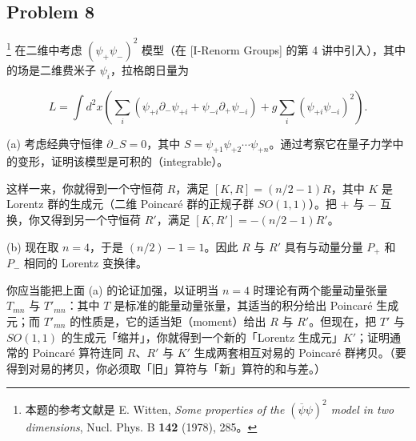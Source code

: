 
\subsection*{Problem 8}

\footnote{本题的参考文献是 E. Witten, \textit{Some properties of the $(\overline{\psi}\psi)^2$ model in two dimensions}, Nucl. Phys. B \textbf{142} (1978), 285。}%
在二维中考虑 $(\psi_+\psi_-)^2$ 模型（在 [I-Renorm Groups] 的第 4 讲中引入），其中的场是二维费米子 $\psi_i$，拉格朗日量为

\begin{equation}
  \tag{8}
  \label{eq:ex-8}
  L=\int d^2x\left(\sum_i\left(\psi_{+i}\partial_-\psi_{+i}+\psi_{-i}\partial_+\psi_{-i}\right)+g\sum_i\left(\psi_{+i}\psi_{-i}\right)^2\right).
\end{equation}


(a) 考虑经典守恒律 $\partial_-S=0$，其中 $S=\psi_{+1}\psi_{+2}\cdots\psi_{+n}$。通过考察它在量子力学中的变形，证明该模型是可积的（integrable）。

这样一来，你就得到一个守恒荷 $R$，满足 $[K,R]=(n/2-1)R$，其中 $K$ 是 Lorentz 群的生成元（二维 Poincaré 群的正规子群 $SO(1,1)$）。把 $+$ 与 $-$ 互换，你又得到另一个守恒荷 $R'$，满足 $[K,R']=-(n/2-1)R'$。

(b) 现在取 $n=4$，于是 $(n/2)-1=1$。因此 $R$ 与 $R'$ 具有与动量分量 $P_+$ 和 $P_-$ 相同的 Lorentz 变换律。


你应当能把上面 (a) 的论证加强，以证明当 $n=4$ 时理论有两个能量动量张量 $T_{mn}$ 与 $T'_{mn}$：其中 $T$ 是标准的能量动量张量，其适当的积分给出 Poincaré 生成元；而 $T'_{mn}$ 的性质是，它的适当矩（moment）给出 $R$ 与 $R'$。但现在，把 $T'$ 与 $SO(1,1)$ 的生成元「缩并」，你就得到一个新的「Lorentz 生成元」$K'$；证明通常的 Poincaré 算符连同 $R$、$R'$ 与 $K'$ 生成两套相互对易的 Poincaré 群拷贝。（要得到对易的拷贝，你必须取「旧」算符与「新」算符的和与差。）

